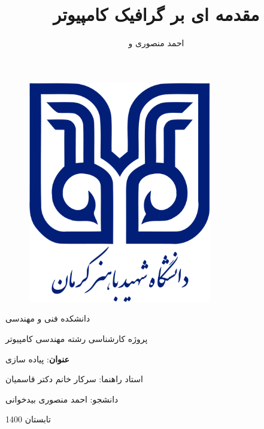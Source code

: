 \documentclass[a4paper, 12pt]{book}
\title{ مقدمه ای بر گرافیک کامپیوتر}
\author{احمد منصوری و \lr{\textsf{\textbf{peter shirley}}}}
\date{\lr{December 21, 2009}}
\begin{document}
\let\cleardoublepage\clearpage

\begin{titlepage}
\begin{figure}[H]
    \centering
        \includegraphics[width=8cm]{images/logo.png}
\end{figure}

\vspace*{2cm}
    \begin{center}
      \large
      دانشکده فنی و مهندسی\par
      پروژه کارشناسی رشته مهندسی کامپیوتر\par
      \textbf{عنوان}:
      پیاده سازی \par
      استاد راهنما: سرکار خانم دکتر قاسمیان\par
      دانشجو: احمد منصوری بیدخوانی\par
      \normalsize
      تابستان 1400
    \end{center}

\end{titlepage}
\end{document}
